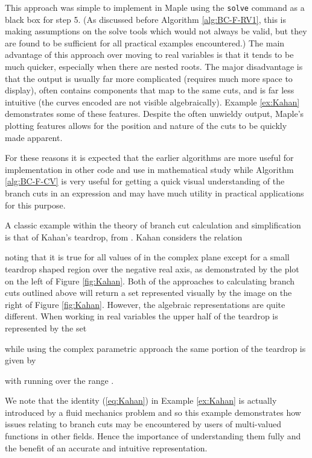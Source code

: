 \documentclass{llncs}
\begin{document}
This approach was simple to implement in {\sc Maple} using the \texttt{solve} command as a black box for step 5.  (As discussed before Algorithm \ref{alg:BC-F-RV1}, this is making assumptions on the solve tools which would not always be valid, but they are found to be sufficient for all practical examples encountered.)   
The main advantage of this approach over moving to real variables is that it tends to be much quicker, especially when there are nested roots.  The major disadvantage is that the output is usually far more complicated (requires much more space to display), often contains components that map to the same cuts, and is far less intuitive (the curves encoded are not visible algebraically).  Example \ref{ex:Kahan} demonstrates some of these features.  Despite the often unwieldy output, {\sc Maple}'s plotting features allows for the position and nature of the cuts to be quickly made apparent.

For these reasons it is expected that the earlier algorithms are more useful for implementation in other code and use in mathematical study while Algorithm \ref{alg:BC-F-CV} is very useful for getting a quick visual understanding of the branch cuts in an expression and may have much utility in practical applications for this purpose. 

\begin{example}
\label{ex:Kahan}
A classic example within the theory of branch cut calculation and simplification is that of Kahan's teardrop, from \cite{Kahan87}.  Kahan considers the relation

noting that it is true for all values of  in the complex plane except for a small teardrop shaped region over the negative real axis, as demonstrated by the plot on the left of Figure \ref{fig:Kahan}.  Both of the approaches to calculating branch cuts outlined above will return a set represented visually by the image on the right of Figure \ref{fig:Kahan}.  However, the algebraic representations are quite different.  When working in real variables the upper half of the teardrop is represented by the set

while using the complex parametric approach the same portion of the teardrop is given by  


with  running over the range .  
\end{example}

We note that the identity (\ref{eq:Kahan}) in Example \ref{ex:Kahan} is actually introduced by a fluid mechanics problem and so this example demonstrates how issues relating to branch cuts may be encountered by users of multi-valued functions in other fields.  Hence the importance of understanding them fully and the benefit of an accurate and intuitive representation.
\end{document}
